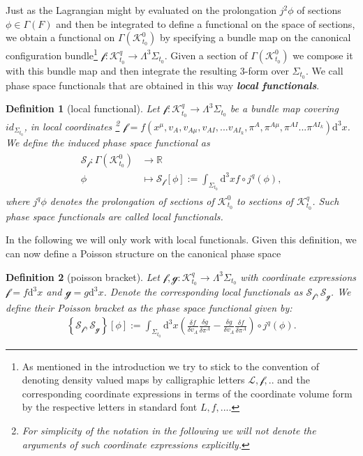\documentclass[a4paper,12pt, DIV=14, BCOR=5mm, twoside, headsepline, numbers=noenddot]{scrbook}
\newtheorem{definition}{Definition}[section]
\begin{document}
Just as the Lagrangian might by evaluated on the prolongation $j^2\phi$ of sections $\phi \in \Gamma(F)$ and then be integrated to define a functional on the space of sections, we obtain a functional on $\Gamma(\mathcal{K}^0_{t_0})$ by specifying a bundle map on the canonical configuration bundle\footnote{As mentioned in the introduction we try to stick to the convention of denoting density valued maps by calligraphic letters $\mathcal{L}, \mathcal{f},..$ and the corresponding coordinate expressions in terms of the coordinate volume form by the respective letters in standard font $L,f,...$.} $\mathcal{f}: \mathcal{K}^q_{t_0} \rightarrow \Lambda^3\Sigma_{t_0}$. Given a section of $\Gamma(\mathcal{K}^0_{t_0})$ we compose it with this bundle map and then integrate the resulting 3-form over $\Sigma_{t_0}$. We call phase space functionals that are obtained in this way \textit{\textbf{local functionals}}.  
\begin{definition}[local functional]
Let $\mathcal{f}: \mathcal{K}^q_{t_0} \rightarrow \Lambda^3\Sigma_{t_0} $ be a bundle map covering $id_{\Sigma_{t_0}}$, in local coordinates \footnote{For simplicity of the notation in the following we will not denote the arguments of such coordinate expressions explicitly.} $\mathcal{f} = f(x^{\mu},v_A,v_{A\mu},v_{AI}, ... v_{AI_k},\pi^A,\pi^{A \mu}, \pi^{AI} ... \pi^{AI_k})\mathrm{d}^3x$. We define the induced phase space functional as
\begin{align}
\begin{aligned}
    \mathcal{S}_{\mathcal{f}} : \Gamma(\mathcal{K}^0_{t_0}) &\longrightarrow \mathbb{R}\\
    \phi &\longmapsto \mathcal{S}_{\mathcal{f}}[\phi] := \int_{\Sigma_{t_0}} \mathrm{d}^3x f \circ j^q(\phi),
\end{aligned}
\end{align}
where $j^q\phi$ denotes the prolongation of sections of $\mathcal{K}^0_{t_0}$ to sections of $\mathcal{K}^q_{t_0}$. Such phase space functionals are called local functionals.
\end{definition}
In the following we will only work with local functionals. 
Given this definition, we can now define a Poisson structure on the canonical phase space 
\begin{definition}[poisson bracket]
Let $\mathcal{f},\mathcal{g} : \mathcal{K}^q_{t_0} \rightarrow \Lambda^3\Sigma_{t_0} $ with coordinate expressions $\mathcal{f} = f\mathrm{d}^3x$ and $\mathcal{g} = g\mathrm{d}^3x$. Denote the corresponding local functionals as $\mathcal{S}_{\mathcal{f}}, \mathcal{S}_{\mathcal{g}}$. We define their Poisson bracket as the phase space functional given by:
\begin{align}
\left \{ \mathcal{S}_{\mathcal{f}}, \mathcal{S}_{\mathcal{g}} \right \}[\phi] := \int _{\Sigma_{t_0}} \mathrm{d}^3x \left ( \frac{\delta f}{\delta v_A} \frac{\delta g}{\delta \pi^A} - \frac{\delta g}{\delta v_A} \frac{\delta f}{\delta \pi^A}     \right ) \circ j^q(\phi)  .
\end{align}
\end{definition}
\end{document}
